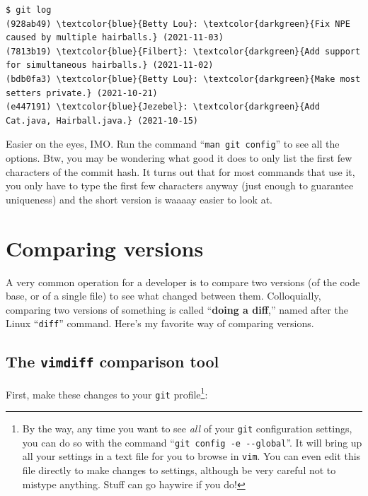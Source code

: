 \begin{Verbatim}[commandchars=\\\{\},fontsize=\scriptsize,samepage=true,frame=single]
$ git log
(928ab49) \textcolor{blue}{Betty Lou}: \textcolor{darkgreen}{Fix NPE caused by multiple hairballs.} (2021-11-03)
(7813b19) \textcolor{blue}{Filbert}: \textcolor{darkgreen}{Add support for simultaneous hairballs.} (2021-11-02)
(bdb0fa3) \textcolor{blue}{Betty Lou}: \textcolor{darkgreen}{Make most setters private.} (2021-10-21)
(e447191) \textcolor{blue}{Jezebel}: \textcolor{darkgreen}{Add Cat.java, Hairball.java.} (2021-10-15)
\end{Verbatim}

Easier on the eyes, IMO. Run the command ``\texttt{man git config}'' to see
all the options. Btw, you may be wondering what good it does to only list the
first few characters of the commit hash. It turns out that for most commands
that use it, you only have to type the first few characters anyway (just
enough to guarantee uniqueness) and the short version is waaaay easier to look
at.

\section{Comparing versions}

A very common operation for a developer is to compare two versions (of the
code base, or of a single file) to see what changed between them.
Colloquially, comparing two versions of something is called ``\textbf{doing a
diff},'' named after the Linux ``\texttt{diff}'' command. Here's my favorite
way of comparing versions.

\subsection{The \texttt{vimdiff} comparison tool}

First, make these changes to your \texttt{git} profile\footnote{By the way,
any time you want to see \textit{all} of your \texttt{git} configuration
settings, you can do so with the command ``\texttt{git config -e -{}-global}''.
It will bring up all your settings in a text file for you to browse in
\texttt{vim}. You can even edit this file directly to make changes to
settings, although be very careful not to mistype anything. Stuff can go
haywire if you do!}:

